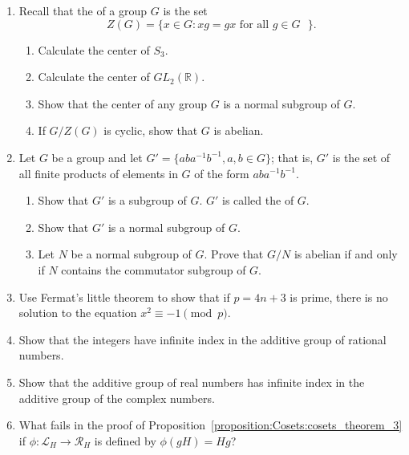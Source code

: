 \begin{enumerate}
 
\item
Recall that the  of a group $G$ is
the set 
\[
Z(G) = \{ x \in G : xg = gx \mbox{ for all $g \in G$ } \}.
\]
\begin{enumerate}
 
 \item
Calculate the center of $S_3$.
 
 \item
Calculate the center of $GL_2 ( {\mathbb R} )$.
 
 \item
Show that the center of any group $G$ is a normal subgroup of $G$. 
 
 \item
If $G / Z(G)$ is cyclic, show that $G$ is abelian.
 
\end{enumerate}

\item
Let $G$ be a group and let $G' = \{ aba^{- 1} b^{-1}, a,b \in G \}$;
that is, $G'$ is the set of all finite products of elements in
$G$ of the form $aba^{-1}b^{-1}$.  
\begin{enumerate}
 \item
Show that $G'$ is a subgroup of $G$. $G'$ is called the
\label{commutatorsubgroup} of $G$.  
 \item
Show that $G'$ is a normal subgroup of $G$.

 \item
Let $N$ be  a normal subgroup of $G$.  Prove that $G/N$ is abelian if
and only if $N$ contains the commutator subgroup of $G$.
 
\end{enumerate}

\item
Use Fermat's little theorem to show that if $p= 4n+3$ is prime, there is no solution to the equation $x^2 \equiv -1 \pmod{p}$.
 
\item
Show that the integers have infinite index in the additive group of rational numbers.
 
\item
Show that the additive group of real numbers has infinite index in the additive group of the complex numbers.
 
 
\item
What fails in the proof of Proposition~\ref{proposition:Cosets:cosets_theorem_3} if $\phi :  {\mathcal L}_H \rightarrow {\mathcal R}_H$ is defined by $\phi( gH ) = Hg$?
 

\end{enumerate}
